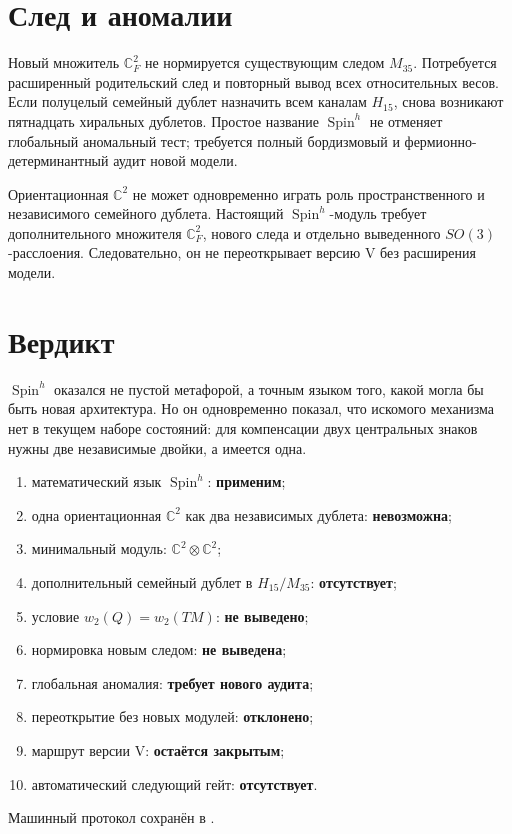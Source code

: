 \section{След и аномалии}

Новый множитель $\mathbb C^2_F$ не нормируется существующим следом
$M_{35}$. Потребуется расширенный родительский след и повторный вывод всех
относительных весов. Если полуцелый семейный дублет назначить всем каналам
$H_{15}$, снова возникают пятнадцать хиральных дублетов. Простое название
$\operatorname{Spin}^h$ не отменяет глобальный аномальный тест; требуется
полный бордизмовый и фермионно-детерминантный аудит новой модели.

\begin{nogocriterion}
Ориентационная $\mathbb C^2$ не может одновременно играть роль
пространственного и независимого семейного дублета. Настоящий
$\operatorname{Spin}^h$-модуль требует дополнительного множителя
$\mathbb C^2_F$, нового следа и отдельно выведенного $SO(3)$-расслоения.
Следовательно, он не переоткрывает версию V без расширения модели.
\end{nogocriterion}

\section{Вердикт}

$\operatorname{Spin}^h$ оказался не пустой метафорой, а точным языком того,
какой могла бы быть новая архитектура. Но он одновременно показал, что
искомого механизма нет в текущем наборе состояний: для компенсации двух
центральных знаков нужны две независимые двойки, а имеется одна.

\begin{protocol}
\begin{enumerate}
 \item математический язык $\operatorname{Spin}^h$:
 \textbf{применим};
 \item одна ориентационная $\mathbb C^2$ как два независимых дублета:
 \textbf{невозможна};
 \item минимальный модуль: \textbf{$\mathbb C^2\otimes\mathbb C^2$};
 \item дополнительный семейный дублет в $H_{15}/M_{35}$:
 \textbf{отсутствует};
 \item условие $w_2(Q)=w_2(TM)$: \textbf{не выведено};
 \item нормировка новым следом: \textbf{не выведена};
 \item глобальная аномалия: \textbf{требует нового аудита};
 \item переоткрытие без новых модулей: \textbf{отклонено};
 \item маршрут версии V: \textbf{остаётся закрытым};
 \item автоматический следующий гейт: \textbf{отсутствует}.
\end{enumerate}
\end{protocol}

Машинный протокол сохранён в
.